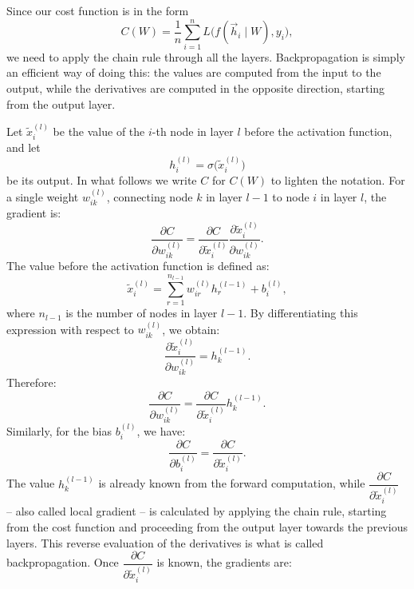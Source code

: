 \documentclass[12pt,a4paper]{article}
\begin{document}
Since our cost function is in the form
\[
C(W) =
\dfrac{1}{n}\sum_{i=1}^{n}
L\bigl(f(\vec{h}_i \mid W), y_i\bigr),
\]
we need to apply the chain rule through all the layers. Backpropagation is simply an efficient way of doing this: the values are computed from the input to the output, while the derivatives are computed in the opposite direction, starting from the output layer.

Let $\tilde{x}_i^{(l)}$ be the value of the $i$-th node in layer $l$ before the activation function, and let
\begin{equation*}
	h_i^{(l)}
	=
	\sigma\bigl(\tilde{x}_i^{(l)}\bigr)
\end{equation*}
be its output. In what follows we write $C$ for $C(W)$ to lighten the notation. For a single weight $w_{ik}^{(l)}$, connecting node $k$ in layer $l-1$ to node $i$ in layer $l$, the gradient is:
\begin{equation*}
	\dfrac{\partial C}{\partial w_{ik}^{(l)}}
	=
	\dfrac{\partial C}{\partial \tilde{x}_i^{(l)}}
	\dfrac{\partial \tilde{x}_i^{(l)}}{\partial w_{ik}^{(l)}}.
\end{equation*}
The value before the activation function is defined as:
\begin{equation*}
	\tilde{x}_i^{(l)}
	=
	\sum_{r=1}^{n_{l-1}}
	w_{ir}^{(l)}h_r^{(l-1)}
	+
	b_i^{(l)},
\end{equation*}
where $n_{l-1}$ is the number of nodes in layer $l-1$. By differentiating this expression with respect to $w_{ik}^{(l)}$, we obtain:
\begin{equation*}
	\dfrac{\partial \tilde{x}_i^{(l)}}{\partial w_{ik}^{(l)}}
	=
	h_k^{(l-1)}.
\end{equation*}
Therefore:
\begin{equation*}
	\dfrac{\partial C}{\partial w_{ik}^{(l)}}
	=
	\dfrac{\partial C}{\partial \tilde{x}_i^{(l)}}
	h_k^{(l-1)}.
\end{equation*}
Similarly, for the bias $b_i^{(l)}$, we have:
\begin{equation*}
	\dfrac{\partial C}{\partial b_i^{(l)}}
	=
	\dfrac{\partial C}{\partial \tilde{x}_i^{(l)}}.
\end{equation*}
The value $h_k^{(l-1)}$ is already known from the forward computation, while $\dfrac{\partial C}{\partial \tilde{x}_i^{(l)}}$ -- also called local gradient --
is calculated by applying the chain rule, starting from the cost function and proceeding from the output layer towards the previous layers. This reverse evaluation of the derivatives is what is called backpropagation.
Once $\dfrac{\partial C}{\partial \tilde{x}_i^{(l)}}$ is known, the gradients are:
\end{document}
